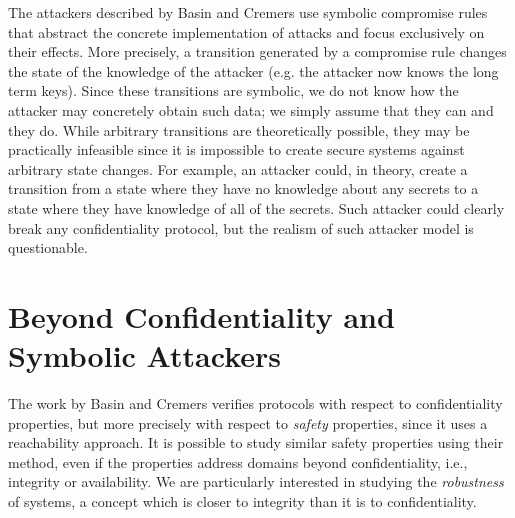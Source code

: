 The attackers described by Basin and Cremers use symbolic compromise rules that abstract the concrete implementation of attacks and focus exclusively on their effects. More precisely, a transition generated by a compromise rule changes the state of the knowledge of the attacker (e.g. the attacker now knows the long term keys). Since these transitions are symbolic, we do not know how the attacker may concretely obtain such data; we simply assume that they can and they do. %
While arbitrary transitions are theoretically possible, they may be practically infeasible since it is impossible to create secure systems against arbitrary state changes. For example, an attacker could, in theory, create a transition from a state where they have no knowledge about any secrets to a state where they have knowledge of all of the secrets. Such attacker could clearly break any confidentiality protocol, but the realism of such attacker model is questionable. 

\section{Beyond Confidentiality and Symbolic Attackers}
The work by Basin and Cremers verifies protocols with respect to confidentiality properties, but more precisely with respect to \emph{safety} properties, since it uses a reachability approach. It is possible to study similar safety properties using their method, even if the properties address domains beyond confidentiality, i.e., integrity or availability. We are particularly interested in studying the \emph{robustness} of systems, a concept which is closer to integrity than it is to confidentiality. 

